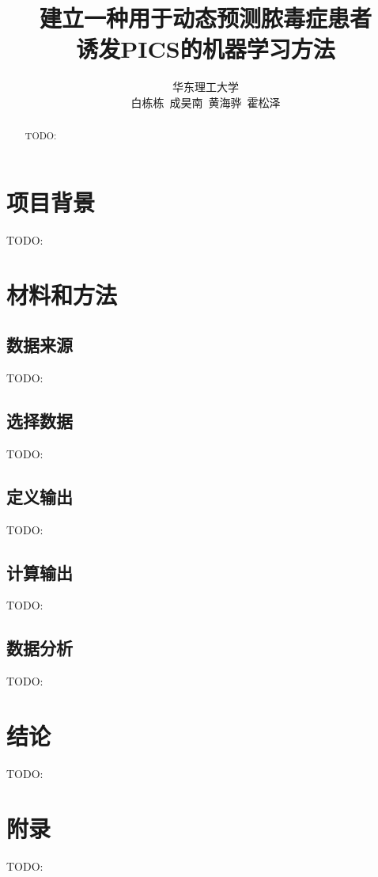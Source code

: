 \documentclass[12pt,titlepage]{article}
\title{建立一种用于动态预测脓毒症患者\\诱发PICS的机器学习方法}
\author{%
华东理工大学\\
白栋栋\ 成昊南\ 黄海骅\ 霍松泽%
}
\date{}
\begin{document}
\maketitle


\begin{abstract}
    TODO:
\end{abstract}


\tableofcontents
\newpage


\section{项目背景}

TODO:


\section{材料和方法}

\subsection{数据来源}

TODO:

\subsection{选择数据}

TODO:

\subsection{定义输出}

TODO:

\subsection{计算输出}

TODO:

\subsection{数据分析}

TODO:





\section{结论}

TODO:


\appendix
\section{附录}

TODO:
\end{document}
